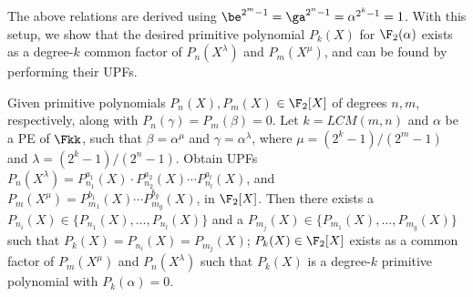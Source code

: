 The above relations are derived using
$\be^{2^m-1}=\ga^{2^n-1}=\alpha^{2^k-1} = 1$.
With this setup, we show that the desired primitive polynomial
$P_k(X)$ for $\F_2(\alpha)$ exists as a degree-$k$ common factor of
$P_n(X^{\lambda})$ and $P_m(X^{\mu})$, and can be found by performing
their UPFs.

\begin{Theorem}\label{thm:Pk}
Given primitive polynomials $P_n(X), P_m(X)$ $\in \F_2[X]$ of degrees
$n,m$, respectively, along with $P_n(\gamma)= P_m(\beta)=0$. Let 
$k=LCM(m,n)$ and $\alpha$ be a PE of $\Fkk$, such that
$\beta=\alpha^\mu$ and $\gamma=\alpha^\lambda$, where
$\mu={(2^k-1)/(2^m-1)}$ and $\lambda={(2^k-1)/(2^n-1)}$. Obtain UPFs
$P_n(X^\lambda)=P_{n_1}^{a_1}(X)\cdot P_{n_2}^{a_2}(X)\cdots
P_{n_l}^{a_l}(X)$, and $P_{m}(X^\mu)=P_{m_1}^{b_1}(X)\cdots
P_{m_g}^{b_g}(X)$, in $\F_2[X]$. Then there exists a $P_{n_i}(X) \in
\{P_{n_1}(X),\dots,P_{n_l}(X)\}$ and a $P_{m_j} (X) \in
\{P_{m_1}(X),\dots,P_{m_g}(X)\}$ such that $P_k(X) = P_{n_i}(X) =
P_{m_j}(X)$; $P_k(X) \in \F_2[X]$ exists as a common factor of $P_m(X^\mu)$
and $P_n(X^\lambda)$ such that $P_k(X)$ is a degree-$k$ primitive polynomial 
with $P_{k}(\alpha)=0$.
\end{Theorem}


